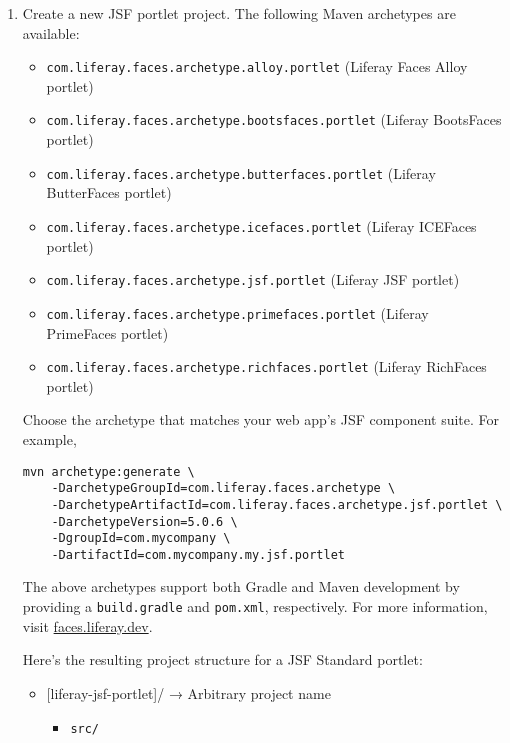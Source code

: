 \begin{enumerate}
\def\labelenumi{\arabic{enumi}.}
\item
  Create a new JSF portlet project. The following Maven archetypes are
  available:

  \begin{itemize}
  \tightlist
  \item
    \texttt{com.liferay.faces.archetype.alloy.portlet} (Liferay Faces
    Alloy portlet)
  \item
    \texttt{com.liferay.faces.archetype.bootsfaces.portlet} (Liferay
    BootsFaces portlet)
  \item
    \texttt{com.liferay.faces.archetype.butterfaces.portlet} (Liferay
    ButterFaces portlet)
  \item
    \texttt{com.liferay.faces.archetype.icefaces.portlet} (Liferay
    ICEFaces portlet)
  \item
    \texttt{com.liferay.faces.archetype.jsf.portlet} (Liferay JSF
    portlet)
  \item
    \texttt{com.liferay.faces.archetype.primefaces.portlet} (Liferay
    PrimeFaces portlet)
  \item
    \texttt{com.liferay.faces.archetype.richfaces.portlet} (Liferay
    RichFaces portlet)
  \end{itemize}

  Choose the archetype that matches your web app's JSF component suite.
  For example,

\begin{verbatim}
mvn archetype:generate \
    -DarchetypeGroupId=com.liferay.faces.archetype \
    -DarchetypeArtifactId=com.liferay.faces.archetype.jsf.portlet \
    -DarchetypeVersion=5.0.6 \
    -DgroupId=com.mycompany \
    -DartifactId=com.mycompany.my.jsf.portlet
\end{verbatim}

  The above archetypes support both Gradle and Maven development by
  providing a \texttt{build.gradle} and \texttt{pom.xml}, respectively.
  For more information, visit
  \href{https://faces.liferay.dev}{faces.liferay.dev}.

  Here's the resulting project structure for a JSF Standard portlet:

  \begin{itemize}
  \tightlist
  \item
    {[}liferay-jsf-portlet{]}/ → Arbitrary project name

    \begin{itemize}
    \tightlist
    \item
      \texttt{src/}


\end{itemize}
\end{itemize}
\end{enumerate}
